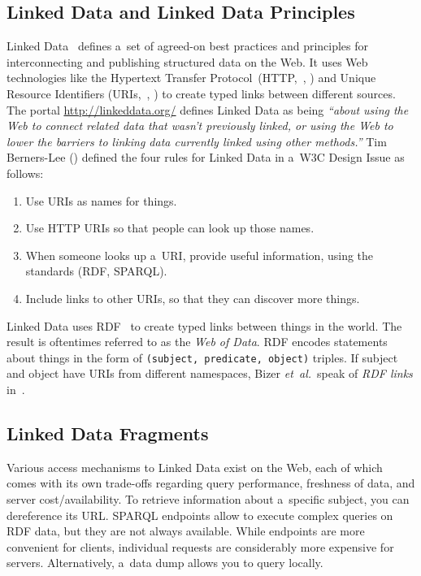 \documentclass[letterpaper]{article}
\newcommand\citep[1]{\citeauthor{#1}, \citeyear{#1}}
\begin{document}
\subsection{Linked Data and Linked Data Principles}

Linked Data~\cite{bernerslee2006linkeddata}
defines a~set of agreed-on best practices and
principles for interconnecting and publishing
structured data on the Web.
It uses Web technologies like the Hypertext Transfer Protocol~(HTTP,~\citep{fielding1999http})
and Unique Resource Identifiers (URIs,~\citep{bernerslee2005uri})
to create typed links between different sources.
The portal \url{http://linkeddata.org/}
defines Linked Data as being
\textit{``about using the Web to connect related data that
wasn't previously linked, or using the Web
to lower the barriers to linking data
currently linked using other methods.''}
Tim Berners-Lee (\citeyear{bernerslee2006linkeddata}) defined the four rules for Linked Data in a~W3C Design Issue as follows:

\begin{enumerate}
  \item Use URIs as names for things.
  \item Use HTTP URIs so that people can look up those names.
  \item When someone looks up a~URI, provide useful information,
        using the standards (RDF, SPARQL).
  \item Include links to other URIs,
        so that they can discover more things.
\end{enumerate}

Linked Data uses RDF~\cite{klyne2004rdf} to create
typed links between things in the world.
The result is oftentimes referred to as the \emph{Web of Data}.
RDF encodes statements about things in the form of
\texttt{(subject, predicate, object)} triples.
If subject and object have URIs from different namespaces,
Bizer \emph{et~al.}\ speak of \emph{RDF links}
in~\cite{heath2011linkeddata}.

\subsection{Linked Data Fragments}
Various access mechanisms to Linked Data exist on the Web,
each of which comes with its own trade-offs regarding
query performance, freshness of data, and server cost/availability.
To retrieve information about a~specific subject,
you can dereference its URL.
SPARQL endpoints allow to execute complex queries on RDF data,
but they are not always available.
While endpoints are more convenient for clients,
individual requests are considerably more expensive for servers.
Alternatively, a~data dump allows you to query locally.
\end{document}
